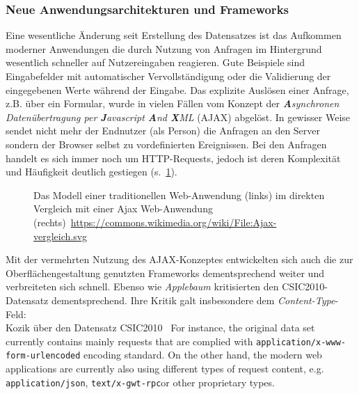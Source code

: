 \subsubsection{Neue Anwendungsarchitekturen und Frameworks}
\label{sec:neueframeworks}
Eine wesentliche Änderung seit Erstellung des Datensatzes ist das Aufkommen moderner Anwendungen die durch Nutzung von Anfragen im Hintergrund wesentlich schneller auf Nutzereingaben reagieren. Gute Beispiele sind Eingabefelder mit automatischer Vervollständigung oder die Validierung der eingegebenen Werte während der Eingabe. Das explizite Auslösen einer Anfrage, z.B. über ein Formular, wurde in vielen Fällen vom Konzept der \emph{\textbf{A}synchronen Datenübertragung per \textbf{J}avascript \textbf{A}nd \textbf{X}ML} (AJAX) abgelöst. In gewisser Weise sendet nicht mehr der Endnutzer (als Person) die Anfragen an den Server sondern der Browser selbst zu vordefinierten Ereignissen. Bei den Anfragen handelt es sich immer noch um HTTP-Requests, jedoch ist deren Komplexität und Häufigkeit deutlich gestiegen (s.~\ref{fig:ajax}).

\begin{figure}[h]
  \centering
  
  \caption{Das Modell einer traditionellen Web-Anwendung (links) im direkten Vergleich mit einer Ajax Web-Anwendung (rechts)~\url{https://commons.wikimedia.org/wiki/File:Ajax-vergleich.svg}}
  \label{fig:ajax}
\end{figure}


Mit der vermehrten Nutzung des AJAX-Konzeptes entwickelten sich auch die zur Oberflächengestaltung genutzten Frameworks dementsprechend weiter und verbreiteten sich schnell. Ebenso wie \emph{Applebaum} kritisierten \cite{kozik2019} den CSIC2010-Datensatz dementsprechend. Ihre Kritik galt insbesondere dem \glqq\emph{Content-Type}\grqq-Feld:\\

\textcolor{bhtGray}{ Kozik über den Datensatz CSIC2010~\cite{kozik2019}} For instance, the original data set currently contains mainly requests that are complied with \glqq\verb=application/x-www-form-urlencoded=\grqq
encoding standard. On the other hand, the modern web applications are currently also using different types of request content, e.g. \glqq\verb=application/json=\grqq, \glqq\verb=text/x-gwt-rpc=\grqq or other proprietary types.\\

